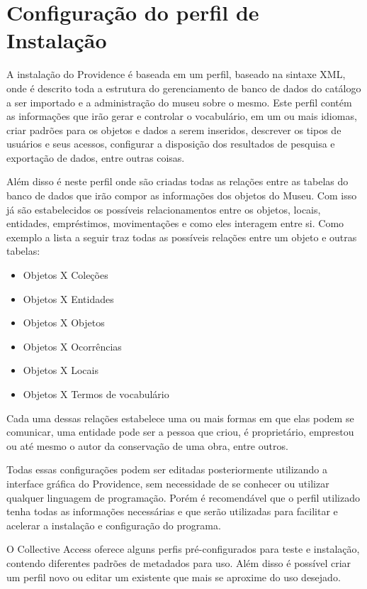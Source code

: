 \documentclass[a4paper,12pt,oneside,onecolumn,final,fleqn]{repUERJ}
\begin{document}
\section{Configuração do perfil de Instalação}

A instalação do Providence é baseada em um perfil, baseado na sintaxe XML, onde é descrito toda a estrutura do gerenciamento de banco de dados do catálogo a ser importado e a administração do museu sobre o mesmo. Este perfil contém as informações que irão gerar e controlar o vocabulário, em um ou mais idiomas, criar padrões para os objetos e dados a serem inseridos, descrever os tipos de usuários e seus acessos, configurar a disposição dos resultados de pesquisa e exportação de dados, entre outras coisas.

Além disso é neste perfil onde são criadas todas as relações entre as tabelas do banco de dados que irão compor as informações dos objetos do Museu. Com isso já são estabelecidos os possíveis relacionamentos entre os objetos, locais, entidades, empréstimos, movimentações e como eles interagem entre si. Como exemplo a lista a seguir traz todas as possíveis relações entre um objeto e outras tabelas:

\begin{itemize}
	\item Objetos X Coleções
	\item Objetos X Entidades
	\item Objetos X Objetos
	\item Objetos X Ocorrências
	\item Objetos X Locais
	\item Objetos X Termos de vocabulário	
\end{itemize}

Cada uma dessas relações estabelece uma ou mais formas em que elas podem se comunicar, uma entidade pode ser a pessoa que criou, é proprietário, emprestou ou até mesmo o autor da conservação de uma obra, entre outros.

Todas essas configurações podem ser editadas posteriormente utilizando a interface gráfica do Providence, sem necessidade de se conhecer ou utilizar qualquer linguagem de programação. Porém é recomendável que o perfil utilizado tenha todas as informações necessárias e que serão utilizadas para facilitar e acelerar a instalação e configuração do programa.

O Collective Access oferece alguns perfis pré-configurados para teste e instalação, contendo diferentes padrões de metadados para uso. Além disso é possível criar um perfil novo ou editar um existente que mais se aproxime do uso desejado.
\end{document}
